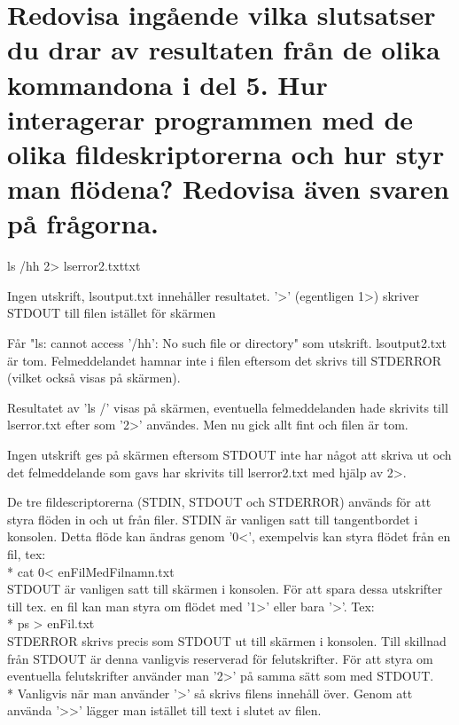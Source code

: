 \documentclass[11pt]{article}
\begin{document}
\section{Redovisa ingående vilka slutsatser du drar av resultaten från de olika kommandona i del 5. Hur interagerar programmen med de olika fildeskriptorerna och hur styr man flödena? Redovisa även svaren på frågorna.}
\begin{labeling}{ls /hh 2> lserror2.txttxt}
\item [ls / > lsoutput.txt]
Ingen utskrift, lsoutput.txt innehåller resultatet. '>' (egentligen 1>) skriver STDOUT till filen istället för skärmen

\item [ls /hh > lsoutput2.txt]
Får "ls: cannot access '/hh': No such file or directory" som utskrift. lsoutput2.txt är tom. Felmeddelandet hamnar inte i filen eftersom det skrivs till STDERROR (vilket också visas på skärmen).

\item [ls / 2> lserror.txt]
Resultatet av 'ls /' visas på skärmen, eventuella felmeddelanden hade skrivits till lserror.txt efter som '2>' användes. Men nu gick allt fint och filen är tom.

\item [ls /hh 2> lserror2.txt]
Ingen utskrift ges på skärmen eftersom STDOUT inte har något att skriva ut och det felmeddelande som gavs har skrivits till lserror2.txt med hjälp av 2>.
\end{labeling}

De tre fildescriptorerna (STDIN, STDOUT och STDERROR) används för att styra flöden in och ut från filer. STDIN är vanligen satt till tangentbordet i konsolen. Detta flöde kan ändras genom '0<', exempelvis kan styra flödet från en fil, tex:\\*
cat 0< enFilMedFilnamn.txt\\
STDOUT är vanligen satt till skärmen i konsolen. För att spara dessa utskrifter till tex. en fil kan man styra om flödet med '1>' eller bara '>'. Tex: \\*
ps > enFil.txt\\
STDERROR skrivs precis som STDOUT ut till skärmen i konsolen. Till skillnad från STDOUT är denna vanligvis reserverad för felutskrifter. För att styra om eventuella felutskrifter använder man '2>' på samma sätt som med STDOUT. \\*
Vanligvis när man använder '>' så skrivs filens innehåll över. Genom att använda '>>' lägger man istället till text i slutet av filen. 
\end{document}
